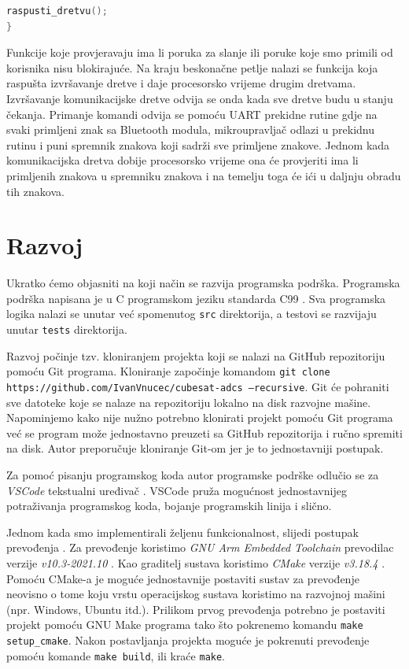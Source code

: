 \documentclass[times, utf8, diplomski, numeric]{templates/template}
\begin{document}
{{{{\begin{lstlisting}[language=C]
    raspusti_dretvu();
}           \end{lstlisting}

                Funkcije koje provjeravaju ima li poruka za slanje ili poruke koje smo primili od korisnika nisu blokirajuće. Na kraju beskonačne petlje nalazi se funkcija koja raspušta izvršavanje dretve i daje procesorsko vrijeme drugim dretvama. Izvršavanje komunikacijske dretve odvija se onda kada sve dretve budu u stanju čekanja. Primanje komandi odvija se pomoću UART prekidne rutine gdje na svaki primljeni znak sa Bluetooth modula, mikroupravljač odlazi u prekidnu rutinu i puni spremnik znakova koji sadrži sve primljene znakove. Jednom kada komunikacijska dretva dobije procesorsko vrijeme ona će provjeriti ima li primljenih znakova u spremniku znakova i na temelju toga će ići u daljnju obradu tih znakova. 

            }
        }
    }

    \section{Razvoj}{
        Ukratko ćemo objasniti na koji način se razvija programska podrška. Programska podrška napisana je u C programskom jeziku standarda C99 \cite{c99}. Sva programska logika nalazi se unutar već spomenutog \texttt{src} direktorija, a testovi se razvijaju unutar \texttt{tests} direktorija. 
        
        Razvoj počinje tzv. kloniranjem projekta koji se nalazi na GitHub repozitoriju \cite{github_repo} pomoću Git programa. Kloniranje započinje komandom \texttt{git clone https://github.com/IvanVnucec/cubesat-adcs --recursive}. Git će pohraniti sve datoteke koje se nalaze na repozitoriju lokalno na disk razvojne mašine. Napominjemo kako nije nužno potrebno klonirati projekt pomoću Git programa već se program može jednostavno preuzeti sa GitHub repozitorija i ručno spremiti na disk. Autor preporučuje kloniranje Git-om jer je to jednostavniji postupak.  

        Za pomoć pisanju programskog koda autor programske podrške odlučio se za \emph{VSCode} tekstualni uređivač \cite{vscode}. VSCode pruža mogućnost jednostavnijeg potraživanja programskog koda, bojanje programskih linija i slično.
        
        Jednom kada smo implementirali željenu funkcionalnost, slijedi postupak prevođenja . Za prevođenje koristimo \emph{GNU Arm Embedded Toolchain} prevodilac  verzije \emph{v10.3-2021.10} \cite{gnu_arm_toolchain}. Kao graditelj sustava  koristimo \emph{CMake} verzije \emph{v3.18.4} \cite{cmake}. Pomoću CMake-a je moguće jednostavnije postaviti sustav za prevođenje neovisno o tome koju vrstu operacijskog sustava koristimo na razvojnoj mašini (npr. Windows, Ubuntu itd.). Prilikom prvog prevođenja potrebno je postaviti projekt pomoću GNU Make programa tako što pokrenemo komandu \texttt{make setup\_cmake}. Nakon postavljanja projekta moguće je pokrenuti prevođenje pomoću komande \texttt{make build}, ili kraće \texttt{make}. 

}}
\end{document}
